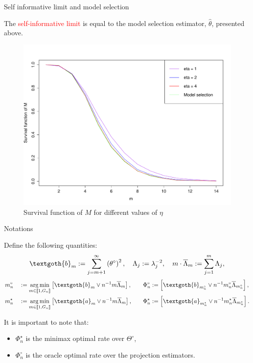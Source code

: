 \documentclass[final,hyperref={pdfpagelabels=false}]{beamer}
\DeclareMathOperator*{\argmin}{arg\,min}
\begin{document}
\begin{frame}[t]
\begin{columns}[t]
\begin{column}{.30\textwidth}
\begin{block}{\rule{0pt}{2.5ex} Self informative limit and model selection}
\medskip

The \textcolor{red}{self-informative limit} is equal to the model selection estimator, $\widehat{\theta}$, presented above.

\begin{figure}[H]
\caption{Survival function of $M$ for different values of $\eta$}
\includegraphics[width=0.5\linewidth]{iteration.pdf}\hfill
\end{figure}

\end{block}


\begin{block}{\rule{0pt}{2.5ex} Notations}
Define the following quantities:
\[\textgoth{b}_{m} := \sum\limits_{j = m + 1}^{\infty} \left(\theta^{\circ}\right)^{2}, \quad \Lambda_{j} := \lambda_{j}^{-2}, \quad m \cdot \overline{\Lambda}_{m} := \sum\limits_{j = 1}^{m} \Lambda_{j},\]
\begin{alignat*}{3}
&m_{n}^{\circ} &&:= \argmin\limits_{m \in \llbracket 1, G_{n} \rrbracket} \left[\textgoth{b}_{m} \vee n^{-1} m \overline{\Lambda}_{m}\right], && \quad \Phi_{n}^{\circ} := \left[\textgoth{b}_{m_{n}^{\circ}}\vee n^{-1} m_{n}^{\circ} \overline{\Lambda}_{m_{n}^{\circ}}\right],\\
&m_{n}^{\star} &&:= \argmin\limits_{m \in \llbracket 1, G_{n} \rrbracket} \left[\textgoth{a}_{m} \vee n^{-1} m \overline{\Lambda}_{m}\right], && \quad \Phi_{n}^{\star} := \left[\textgoth{a}_{m_{n}^{\star}} \vee n^{-1} m_{n}^{\star} \overline{\Lambda}_{m_{n}^{\star}}\right].
\end{alignat*}

It is important to note that:
\begin{itemize}
\item $\Phi_{n}^{\star}$ is the minimax optimal rate over $\Theta^{\circ}$,
\item $\Phi_{n}^{\circ}$ is the oracle optimal rate over the projection estimators.
\end{itemize}
\end{block}


\end{column}
\end{columns}
\end{frame}
\end{document}
